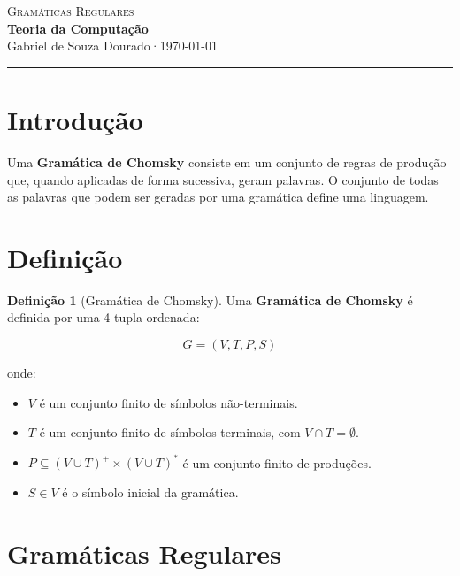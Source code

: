\documentclass[12pt, a4paper]{article}
\theoremstyle{definition}
\newtheorem{definition}{Definição}[section]
\theoremstyle{plain}
\theoremstyle{remark}
\newcommand{\docauthor}{Gabriel de Souza Dourado}
\newcommand{\doctitle}{Teoria da Computação}
\newcommand{\docsubtitle}{Gramáticas Regulares}
\newcommand{\docdate}{\today}
\begin{document}
\begin{center}
  {\large \textcolor{mainblue}{\textsc{\docsubtitle}}}\\[0.4em]
  {\LARGE \textbf{\doctitle}}\\[0.6em]
  {\small \docauthor \quad·\quad \docdate}
  \vspace{0.4em}
  \hrule
\end{center}

\vspace{1em}


\section{Introdução}
Uma \textbf{Gramática de Chomsky} consiste em um conjunto de regras de produção que, quando aplicadas de forma sucessiva, geram palavras. O conjunto de todas as palavras que podem ser geradas por uma gramática define uma linguagem.

\section{Definição}

\begin{definition}[Gramática de Chomsky]
Uma \textbf{Gramática de Chomsky} é definida por uma 4-tupla ordenada:

\[
G = (V, T, P, S)
\]

onde:

\begin{itemize}
    \item \(V\) é um conjunto finito de símbolos não-terminais.
    \item \(T\) é um conjunto finito de símbolos terminais, com \(V \cap T = \emptyset\).
    \item \(P \subseteq (V \cup T)^{+} \times (V \cup T)^*\) é um conjunto finito de produções.
    \item \(S \in V\) é o símbolo inicial da gramática.
\end{itemize} 
\end{definition}
    
\section{Gramáticas Regulares}
\end{document}

